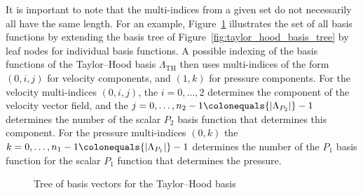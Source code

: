 \documentclass[a4paper,10pt,headings=normal,bibliography=totoc]{scrartcl}
\newcommand{\abs}[1]{{\lvert#1\rvert}}
\begin{document}
It is important to note that the multi-indices from a given set do not necessarily
all have the same length. For an example,
Figure~\ref{fig:taylor_hood_basis_function_tree} illustrates the set of all basis
functions by extending the basis tree of Figure~\ref{fig:taylor_hood_basis_tree}
by leaf nodes for individual basis functions.
A possible indexing of the basis functions of the Taylor--Hood basis $\Lambda_\text{TH}$ then
uses multi-indices of the form $(0,i,j)$ for velocity components, and $(1,k)$
for pressure components.
For the velocity multi-indices $(0,i,j)$, the $i = 0,\dots,2$ determines the component
of the velocity vector field, and the $j = 0,\dots,n_2-1 \colonequals \abs{\Lambda_{P_2}}-1$ determines the number of the scalar $P_2$ basis
function that determines this component.
For the pressure multi-indices $(0,k)$ the $k= 0,\dots,n_1-1 \colonequals \abs{\Lambda_{P_1}}-1$ determines the number of the $P_1$ basis
function for the scalar $P_1$ function that determines the pressure.

\begin{figure}
    \begin{center}
    \end{center}
    \caption{Tree of basis vectors for the Taylor--Hood basis}
    \label{fig:taylor_hood_basis_function_tree}
\end{figure}
\end{document}
